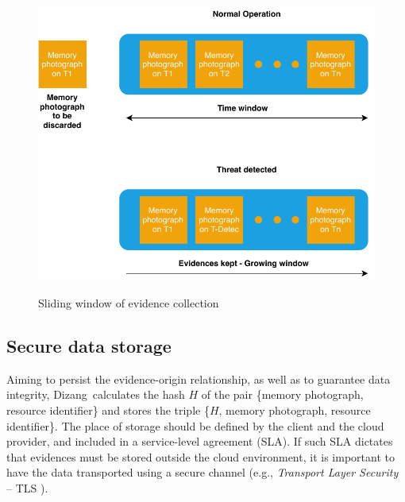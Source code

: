 \documentclass[conference]{IEEEtran}
\newcommand{\fancyname}{Dizang}
\begin{document}
\begin{figure}[tb!]
\footnotesize
\caption{Sliding window of evidence collection}
\includegraphics[center,scale=0.70]{janela_ieee-eng.pdf}
\centering
\label{fig:janela}
\end{figure}



\subsection{Secure data storage}
\label{sec:proposal-desc-memcpy}


%
Aiming to persist the evidence-origin relationship, as well as to guarantee data integrity, \fancyname\ calculates the hash $H$ of the pair \{memory photograph, resource identifier\} and stores the triple \{$H$, memory photograph, resource identifier\}.
%
The place of storage should be defined by the client and the cloud provider, and included in a service-level agreement (SLA).
%
If such SLA dictates that evidences must be stored outside the cloud environment, it is important to have the data transported using a secure channel (e.g., \textit{Transport Layer Security} – TLS \cite{DierksT2008}).

\end{document}
